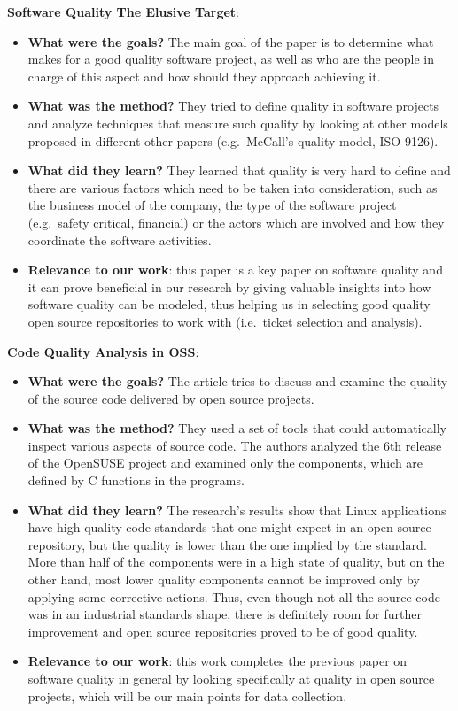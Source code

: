 \documentclass{mprop}
\begin{document}
\textbf{Software Quality \- The Elusive Target}\cite{kitchenham1996software}:
\begin{itemize}
  \item \textbf{What were the goals?}
    The main goal of the paper is to determine what makes for a good quality
    software project, as well as who are the people in charge of this aspect
    and how should they approach achieving it.
  \item \textbf{What was the method?}
    They tried to define quality in software projects and analyze techniques that 
    measure such quality by looking at other models proposed in different other  
    papers (e.g.\ McCall's quality model, ISO 9126).
  \item \textbf{What did they learn?}
    They learned that quality is very hard to define and there are various 
    factors which need to be taken into consideration, such as the business
    model of the company, the type of the software project (e.g.\ safety
    critical, financial) or the actors which are involved and how they
    coordinate the software activities.
  \item \textbf{Relevance to our work}: this paper is a key paper on software  
    quality and it can prove beneficial in our research by
    giving valuable insights into how software quality can be modeled, thus
    helping us in selecting good quality open source repositories to work with 
    (i.e.\ ticket selection and analysis).
\end{itemize}

\textbf{Code Quality Analysis in OSS}\cite{stamelos2002code}:
\begin{itemize}
  \item \textbf{What were the goals?}
    The article tries to discuss and examine the quality of the source code
    delivered by open source projects.
  \item \textbf{What was the method?}
    They used a set of tools that could automatically inspect various aspects
    of source code. The authors analyzed the 6th release of the OpenSUSE project
    and examined only the components, which are defined by C functions in the
    programs.
  \item \textbf{What did they learn?}
    The research's results show that Linux applications have high quality 
    code standards that one might expect in an open source repository, but 
    the quality is lower than the one implied by the standard. More than half
    of the components were in a high state of quality, but on the other hand, 
    most lower quality components cannot be improved only by applying some
    corrective actions. Thus, even though not all the source code was in 
    an industrial standards shape, there is definitely room for further 
    improvement and open source repositories proved to be of good quality.
  \item \textbf{Relevance to our work}: this work completes the previous paper
    on software quality in general by looking specifically at quality in
    open source projects, which will be our main points for data collection.
\end{itemize}
\end{document}
